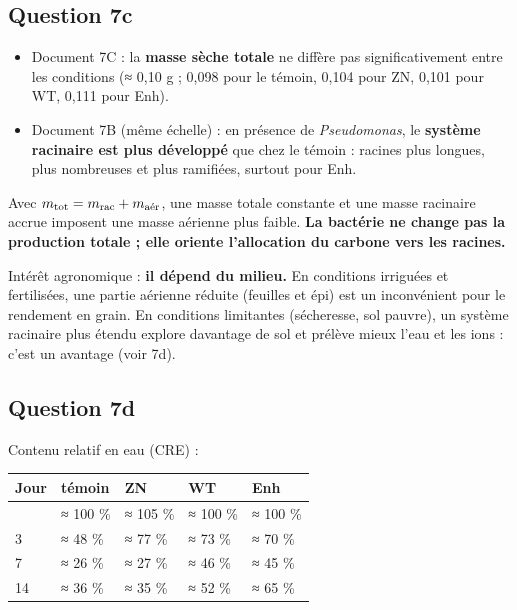 \documentclass[11pt,a4paper]{article}
\providecommand{\tightlist}{\setlength{\itemsep}{0pt}\setlength{\parskip}{0pt}}
\begin{document}
\hypertarget{question-7c}{%
\subsection{Question 7c}\label{question-7c}}

\begin{itemize}
\tightlist
\item
  Document 7C : la \textbf{masse sèche totale} ne diffère pas significativement entre les conditions (≈ 0,10 g ; 0,098 pour le témoin, 0,104 pour ZN, 0,101 pour WT, 0,111 pour Enh).
\item
  Document 7B (même échelle) : en présence de \emph{Pseudomonas}, le \textbf{système racinaire est plus développé} que chez le témoin : racines plus longues, plus nombreuses et plus ramifiées, surtout pour Enh.
\end{itemize}

Avec \(m_{\text{tot}}=m_{\text{rac}}+m_{\text{\text{aér}}}\), une masse totale constante et une masse racinaire accrue imposent une masse aérienne plus faible. \textbf{La bactérie ne change pas la production totale ; elle oriente l'allocation du carbone vers les racines.}

Intérêt agronomique : \textbf{il dépend du milieu.} En conditions irriguées et fertilisées, une partie aérienne réduite (feuilles et épi) est un inconvénient pour le rendement en grain. En conditions limitantes (sécheresse, sol pauvre), un système racinaire plus étendu explore davantage de sol et prélève mieux l'eau et les ions : c'est un avantage (voir 7d).

\hypertarget{question-7d}{%
\subsection{Question 7d}\label{question-7d}}

Contenu relatif en eau (CRE) :

\begin{longtable}[]{@{}lllll@{}}
\toprule\noalign{}
Jour & témoin & ZN & WT & Enh \\
\midrule\noalign{}
\endhead
\bottomrule\noalign{}
\endlastfoot
0 & ≈ 100 \% & ≈ 105 \% & ≈ 100 \% & ≈ 100 \% \\
3 & ≈ 48 \% & ≈ 77 \% & ≈ 73 \% & ≈ 70 \% \\
7 & ≈ 26 \% & ≈ 27 \% & ≈ 46 \% & ≈ 45 \% \\
14 & ≈ 36 \% & ≈ 35 \% & ≈ 52 \% & ≈ 65 \% \\
\end{longtable}
\end{document}
